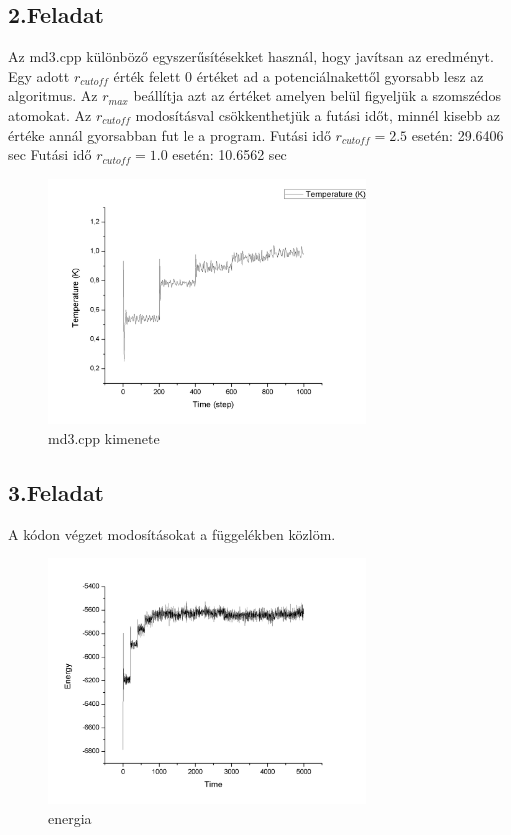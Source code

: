 \documentclass[paper=a4, fontsize=11pt]{article}
\begin{document}
\subsection{2.Feladat }
Az md3.cpp különböző egyszerűsítésekket használ, hogy javítsan az eredményt. Egy adott $r_{cutoff}$ érték felett 0 értéket ad a potenciálnakettől gyorsabb lesz az algoritmus. Az $r_{max}$ beállítja azt az értéket amelyen belül figyeljük a szomszédos atomokat. Az $r_{cutoff}$ modosításval csökkenthetjük a futási időt, minnél kisebb az értéke annál gyorsabban fut le a program.
\newline
Futási idő  $r_{cutoff}=2.5$ esetén: 29.6406 sec
\newline
Futási idő  $r_{cutoff}=1.0$ esetén: 10.6562 sec
\begin{figure}[H]
    \centering
    \includegraphics[width=0.75\textwidth]{md3}
    \caption{md3.cpp kimenete }
\end{figure}

\subsection{3.Feladat }
A kódon végzet modosításokat a függelékben közlöm.


\begin{figure}[H]
    \centering
    \includegraphics[width=0.75\textwidth]{E}
    \caption{energia}
\end{figure}
\end{document}
